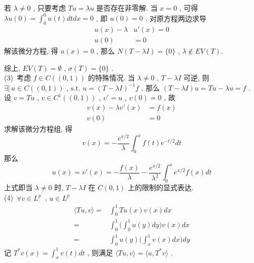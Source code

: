 \documentclass[a4paper, UTF8]{ctexart}				%
\numberwithin{equation}{section}				%
\begin{document}
        若 $\lambda \neq 0$ , 只要考虑 $Tu = \lambda u$ 是否存在非零解. 当 $x = 0$ , 可得 $\lambda u(0) = \int^0_0 u(t)dt dx = 0$ , 即 $u(0) = 0$ . 对原方程两边求导 
        \begin{equation*}
            \begin{split}
                u(x) - \lambda & u'(x) = 0\\
                u(0) & = 0
            \end{split}
        \end{equation*}
        解该微分方程, 得 $u(x) = 0$ , 那么 $N(T - \lambda I) = \{0\}$ , $\lambda \notin EV(T)$.
        
        综上, $EV(T) = \emptyset$ , $\sigma(T) = \{0\}$ .\\

        \noindent (3) \,考虑 $f \in C((0, 1))$ 的特殊情况. 当 $\lambda \neq 0$ , $T - \lambda I$ 可逆, 则 $\exists |\, u \in C((0, 1))$ , $\text{s.t. } u = (T - \lambda I)^{-1} f$ , 那么 $(T - \lambda I)u = Tu - \lambda u = f$ . 设 $v = T u$ , $v \in C^1((0, 1))$ , $v' = u$ , $v(0) = 0$ , 故 
        \begin{equation*}
            \begin{split}
                v(x) - \lambda v'(x) & = f(x)\\
                v(0) & = 0
            \end{split}
        \end{equation*}
         求解该微分方程组, 得 
         \[
             v(x) = -\frac{e^{x/2}}{\lambda} \int^x_0 f(t) e^{-t/2} dt
         \]
         那么 
         \[
             u(x) = v'(x) = -\frac{f(x)}{\lambda}-\frac{e^{x/2}}{\lambda^2}\int^x_0 e^{x/2} f(x) dt
         \]
         上式即当 $\lambda \neq 0$ 时, $T - \lambda I$ 在 $C(0, 1)$ 上的限制的显式表达.\\

         \noindent (4) \,$\forall v \in L^{p^{'}}$ , $u \in L^p$
         \begin{equation*}
             \begin{split}
                    \langle{Tu},{v}\rangle
                 =  & \int^1_0 Tu(x) v(x) dx\\
                 =  & \int^1_0 \Big( \int^1_0 u(y) dy \Big) v(x) dx\\
                 =  & \int^1_0 u(y) \Big( \int^1_x v(x) dx \Big) dy
             \end{split}
         \end{equation*}
         记 $T^*v(x) = \int^1_x v(t)dt$ , 则满足 $\langle{Tu},{v}\rangle = \langle{u},{T^*v}\rangle$ .
\end{document}
